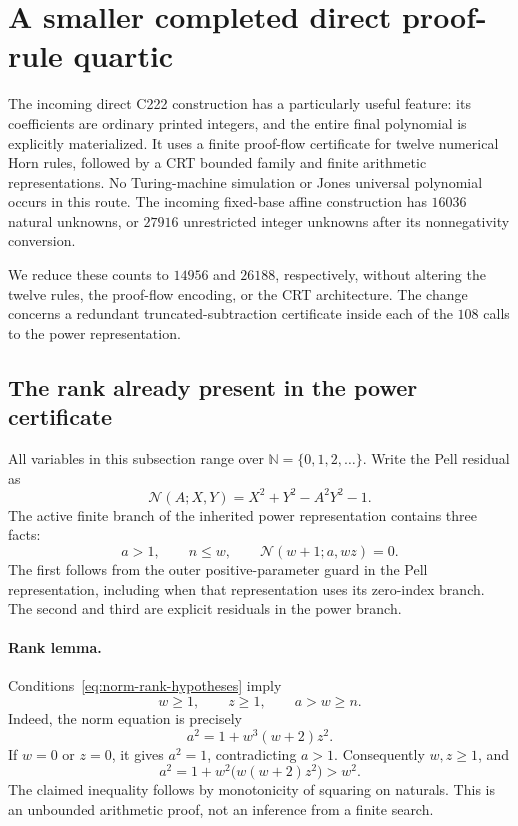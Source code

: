 \documentclass[11pt,letterpaper]{article}
\theoremstyle{remark}\newtheorem{remark}[theorem]{Remark}
\begin{document}
\section{A smaller completed direct proof-rule quartic}
\label{sec:direct-normalized-power}

The incoming direct C222 construction has a particularly useful feature:
its coefficients are ordinary printed integers, and the entire final
polynomial is explicitly materialized. It uses a finite proof-flow
certificate for twelve numerical Horn rules, followed by a CRT bounded
family and finite arithmetic representations. No Turing-machine simulation
or Jones universal polynomial occurs in this route. The incoming
fixed-base affine construction has $16036$ natural unknowns, or $27916$
unrestricted integer unknowns after its nonnegativity conversion.

We reduce these counts to $14956$ and $26188$, respectively, without
altering the twelve rules, the proof-flow encoding, or the CRT architecture.
The change concerns a redundant truncated-subtraction certificate inside
each of the $108$ calls to the power representation.

\subsection{The rank already present in the power certificate}

All variables in this subsection range over $\mathbb N=\{0,1,2,\ldots\}$.
Write the Pell residual as
\[
 \mathcal N(A;X,Y)=X^2+Y^2-A^2Y^2-1.
\]
The active finite branch of the inherited power representation contains
three facts:
\begin{equation}\label{eq:norm-rank-hypotheses}
 a>1,\qquad n\leq w,\qquad
 \mathcal N(w+1;a,wz)=0.
\end{equation}
The first follows from the outer positive-parameter guard in the Pell
representation, including when that representation uses its zero-index
branch. The second and third are explicit residuals in the power branch.

\paragraph{Rank lemma.}
Conditions~\eqref{eq:norm-rank-hypotheses} imply
\[
 w\geq1,\qquad z\geq1,\qquad a>w\geq n.
\]
Indeed, the norm equation is precisely
\[
 a^2=1+w^3(w+2)z^2.
\]
If $w=0$ or $z=0$, it gives $a^2=1$, contradicting $a>1$.
Consequently $w,z\geq1$, and
\[
 a^2=1+w^2\bigl(w(w+2)z^2\bigr)>w^2.
\]
The claimed inequality follows by monotonicity of squaring on naturals.
This is an unbounded arithmetic proof, not an inference from a finite search.
\end{document}
